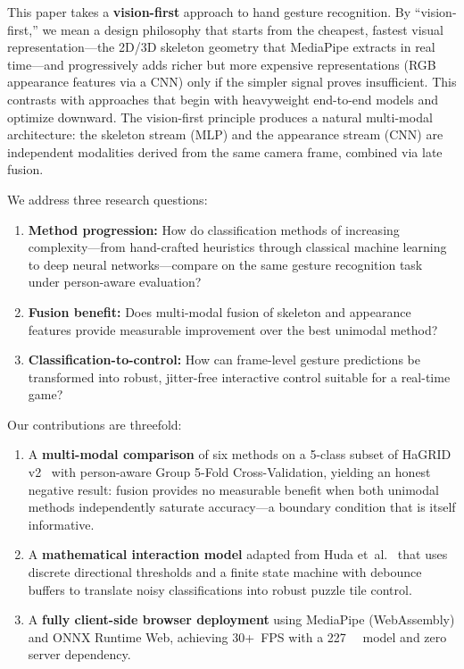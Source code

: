 \documentclass[11pt,a4paper]{article}
\begin{document}
This paper takes a \textbf{vision-first} approach to hand gesture recognition. By ``vision-first,'' we mean a design philosophy that starts from the cheapest, fastest visual representation---the 2D/3D skeleton geometry that MediaPipe extracts in real time---and progressively adds richer but more expensive representations (RGB appearance features via a CNN) only if the simpler signal proves insufficient. This contrasts with approaches that begin with heavyweight end-to-end models and optimize downward. The vision-first principle produces a natural multi-modal architecture: the skeleton stream (MLP) and the appearance stream (CNN) are independent modalities derived from the same camera frame, combined via late fusion.

We address three research questions:
\begin{enumerate}
    \item[\textbf{Q1.}] \textbf{Method progression:} How do classification methods of increasing complexity---from hand-crafted heuristics through classical machine learning to deep neural networks---compare on the same gesture recognition task under person-aware evaluation?
    \item[\textbf{Q2.}] \textbf{Fusion benefit:} Does multi-modal fusion of skeleton and appearance features provide measurable improvement over the best unimodal method?
    \item[\textbf{Q3.}] \textbf{Classification-to-control:} How can frame-level gesture predictions be transformed into robust, jitter-free interactive control suitable for a real-time game?
\end{enumerate}

Our contributions are threefold:
\begin{enumerate}
    \item A \textbf{multi-modal comparison} of six methods on a 5-class subset of HaGRID v2~\citep{hagrid2022} with person-aware Group 5-Fold Cross-Validation, yielding an honest negative result: fusion provides no measurable benefit when both unimodal methods independently saturate accuracy---a boundary condition that is itself informative.
    \item A \textbf{mathematical interaction model} adapted from Huda et~al.~\citep{huda2025wheelchair} that uses discrete directional thresholds and a finite state machine with debounce buffers to translate noisy classifications into robust puzzle tile control.
    \item A \textbf{fully client-side browser deployment} using MediaPipe (WebAssembly) and ONNX Runtime Web, achieving 30+~FPS with a \SI{227}{\kilo\byte} model and zero server dependency.
\end{enumerate}
\end{document}
